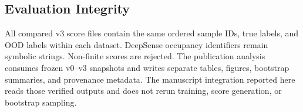 \subsection{Evaluation Integrity}

All compared v3 score files contain the same ordered sample IDs, true labels, and OOD labels within each dataset. DeepSense occupancy identifiers remain symbolic strings. Non-finite scores are rejected. The publication analysis consumes frozen v0--v3 snapshots and writes separate tables, figures, bootstrap summaries, and provenance metadata. The manuscript integration reported here reads those verified outputs and does not rerun training, score generation, or bootstrap sampling.
